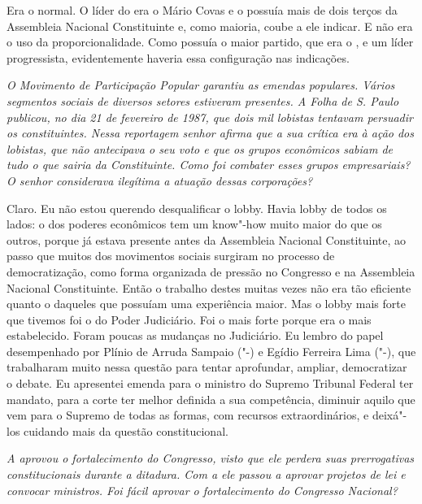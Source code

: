 Era o normal. O líder do  era o Mário Covas e o
 possuía mais de dois terços da Assembleia Nacional Constituinte e,
como maioria, coube a ele indicar. E não era o uso da proporcionalidade.
Como possuía o maior partido, que era o , e um líder progressista,
evidentemente haveria essa configuração nas indicações.

\medskip

\noindent\emph{O Movimento de Participação Popular garantiu as emendas
populares. Vários segmentos sociais de diversos setores estiveram
presentes. A Folha de S. Paulo publicou, no dia 21 de fevereiro de 1987,
que dois mil lobistas tentavam persuadir os constituintes. Nessa
reportagem senhor afirma que a sua crítica era à ação dos lobistas, que
não antecipava o seu voto e que os grupos econômicos sabiam de tudo o
que sairia da Constituinte. Como foi combater esses grupos empresariais?
O senhor considerava ilegítima a atuação dessas corporações?}

Claro. Eu não estou querendo desqualificar o lobby.
Havia lobby de todos os lados: o dos poderes econômicos tem um know"-how
muito maior do que os outros, porque já estava presente antes da
Assembleia Nacional Constituinte, ao passo que muitos dos movimentos
sociais surgiram no processo de democratização, como forma organizada de
pressão no Congresso e na Assembleia Nacional Constituinte. Então o
trabalho destes muitas vezes não era tão eficiente quanto o daqueles que
possuíam uma experiência maior. Mas o lobby mais forte que tivemos foi o
do Poder Judiciário. Foi o mais forte porque era o mais estabelecido.
Foram poucas as mudanças no Judiciário. Eu lembro do papel desempenhado
por Plínio de Arruda Sampaio ("-) e Egídio Ferreira Lima ("-),
que trabalharam muito nessa questão para tentar aprofundar, ampliar,
democratizar o debate. Eu apresentei emenda para o ministro do Supremo
Tribunal Federal ter mandato, para a corte ter melhor definida a sua
competência, diminuir aquilo que vem para o Supremo de todas as formas,
com recursos extraordinários, e deixá"-los cuidando mais da questão
constitucional.

\medskip

\noindent\emph{A  aprovou o fortalecimento do Congresso, visto que ele
perdera suas prerrogativas constitucionais durante a ditadura. Com a 
ele passou a aprovar projetos de lei e convocar ministros. Foi fácil
aprovar o fortalecimento do Congresso Nacional?}


